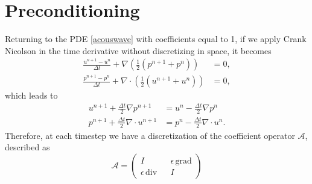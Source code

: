 \documentclass[11pt]{article}
\newcommand{\divv}{\mathrm{div}}
\newcommand{\gradd}{\mathrm{grad}}
\begin{document}
\section{Preconditioning}
Returning to the PDE \eqref{acouswave} with coefficients equal to 1, if we apply Crank Nicolson in the time derivative without discretizing in space, it becomes
\begin{equation}
\begin{split}
\frac{u^{n+1}-u^n}{\Delta t} + \nabla \left( \frac{1}{2}\left( p^{n+1} + p^n \right) \right) &= 0,\\
\frac{p^{n+1} -p^n}{\Delta t} + \nabla \cdot \left( \frac{1}{2} \left( u^{n+1}+u^n \right)\right) &=0,
\end{split}
\end{equation}
which leads to
\begin{equation}
\begin{split}
u^{n+1} + \frac{\Delta t}{2}\nabla p^{n+1} &= u^n - \frac{\Delta t}{2}\nabla p^n\\
p^{n+1} + \frac{\Delta t}{2}\nabla \cdot u^{n+1} &= p^n - \frac{\Delta t}{2}\nabla \cdot u^n.
\end{split}
\end{equation}
Therefore, at each timestep we have a discretization of the coefficient operator $\mathscr{A}$, described as
\begin{equation}
\mathscr{A} = \begin{pmatrix}
I && \epsilon\,\gradd \\
\epsilon\,\divv && I
\end{pmatrix}
\end{equation} %
\end{document}
